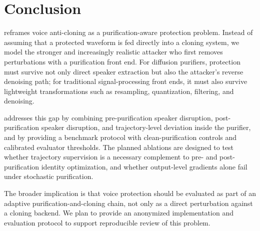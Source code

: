 \section{Conclusion}
\label{sec:conclusion}

\method{} reframes voice anti-cloning as a purification-aware protection problem. 
Instead of assuming that a protected waveform is fed directly into a cloning system, we model the stronger and increasingly realistic attacker who first removes perturbations with a purification front end. 
For diffusion purifiers, protection must survive not only direct speaker extraction but also the attacker's reverse denoising path; 
for traditional signal-processing front ends, it must also survive lightweight transformations such as resampling, quantization, filtering, and denoising.

\method{} addresses this gap by combining pre-purification speaker disruption, post-purification speaker disruption, and trajectory-level deviation inside the purifier, 
and by providing a benchmark protocol with clean-purification controls and calibrated evaluator thresholds. 
The planned ablations are designed to test whether trajectory supervision is a necessary complement to pre- and post-purification identity optimization, and whether output-level gradients alone fail under stochastic purification.

The broader implication is that voice protection should be evaluated as part of an adaptive purification-and-cloning chain, not only as a direct perturbation against a cloning backend. 
We plan to provide an anonymized implementation and evaluation protocol to support reproducible review of this problem.
